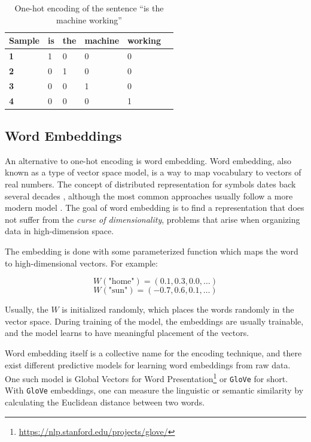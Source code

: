 \begin{table}[h]
    \centering
    \begin{tabular}{|l|l|l|l|l|l|}
        \hline
        \textbf{Sample} & \textbf{is} & \textbf{the} & \textbf{machine} & \textbf{working} \\ \hline
        \textbf{1}      & 1           & 0            & 0                & 0                \\ \hline
        \textbf{2}      & 0           & 1            & 0                & 0                \\ \hline
        \textbf{3}      & 0           & 0            & 1                & 0                \\ \hline
        \textbf{4}      & 0           & 0            & 0                & 1                \\ \hline
    \end{tabular}
    \caption{One-hot encoding of the sentence ``is the machine working''}
    \label{table:one_hot_encoding}
\end{table}

\subsection{Word Embeddings}
An alternative to one-hot encoding is word embedding. Word embedding, also known as a type of vector space model, is a way to map vocabulary to vectors of real numbers. The concept of distributed representation for symbols dates back several decades \citep{hinton1986learning}, although the most common approaches usually follow a more modern model \citep{bengio2003neural}. The goal of word embedding is to find a representation that does not suffer from the \emph{curse of dimensionality}, problems that arise when organizing data in high-dimension space. 

The embedding is done with some parameterized function which maps the word to high-dimensional vectors. For example:

\begin{equation*}
    W(\text{"home"}) = (0.1, 0.3, 0.0, \ldots)
\end{equation*}
\begin{equation*}
    W(\text{"sun"}) = (-0.7, 0.6, 0.1, \ldots)
\end{equation*}

Usually, the \(W\) is initialized randomly, which places the words randomly in the vector space. During training of the model, the embeddings are usually trainable, and the model learns to have meaningful placement of the vectors.

Word embedding itself is a collective name for the encoding technique, and there exist different predictive models for learning word embeddings from raw data. One such model is Global Vectors for Word Presentation\footnote{\url{https://nlp.stanford.edu/projects/glove/}} or {\tt GloVe} for short. With {\tt GloVe} embeddings, one can measure the linguistic or semantic similarity by calculating the Euclidean distance between two words.
